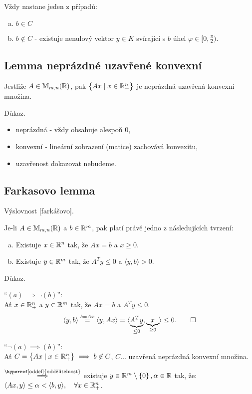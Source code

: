 Vždy nastane jeden z případů:
\begin{enumerate}[(a)]
    \item $b \in C$
    \item $b \not\in C$ - existuje nenulový vektor $y \in K$ svírající s $b$ úhel $\varphi \in [0, \frac{\pi}{2})$.
\end{enumerate}

\subsection{Lemma neprázdné uzavřené konvexní}
Jestliže $A \in \mathbb{M}_{m,n}(\mathbb{R})$, pak $\left\lbrace Ax \mid x \in \mathbb{R}_+^n \right\rbrace$ je neprázdná uzavřená konvexní množina.

Důkaz.
\begin{itemize}
    \item neprázdná - vždy obsahuje alespoň $0$,
    \item konvexní - lineární zobrazení (matice) zachovává konvexitu,
    \item uzavřenost dokazovat nebudeme.
\end{itemize}

\subsection{Farkasovo lemma}\label{farkas}
Výslovnost [farkášovo].

Je-li $A \in \mathbb{M}_{m,n}(\mathbb{R})$ a $b \in \mathbb{R}^m$, pak platí právě jedno z následujících tvrzení:
\begin{enumerate}[(a)]
    \item Existuje $x \in \mathbb{R}^n$ tak, že $Ax = b$ a $x \geq 0$.
    \item Existuje $y \in \mathbb{R}^m$ tak, že $A^Ty \leq 0$ a $\langle y, b\rangle > 0$.
\end{enumerate}

Důkaz.

\enquote{$(a) \implies \lnot (b)$}:\\
Ať $x \in \mathbb{R}^n_+$ a $y \in \mathbb{R}^m$ tak, že $Ax = b$ a $A^T y \leq 0$.
\[
    \langle y, b\rangle \stackrel{b= Ax}{=} \langle y, Ax\rangle = \langle \underbrace{A^Ty}_{\leq 0}, \underbrace{x}_{\geq 0}\rangle \leq 0. \qed 
\]

\enquote{$\lnot (a) \implies (b)$}:\\
Ať $C = \left\lbrace Ax \mid x \in \mathbb{R}^n_+ \right\rbrace \implies b \not\in C$, $C \dots$ uzavřená neprázdná konvexní množina.

$\stackrel{\text{\hyperref[oddel]{oddělitelnost}}}{\implies}$ existuje $y \in \mathbb{R}^m \setminus \left\lbrace 0 \right\rbrace, \alpha \in \mathbb{R}$ tak, 
že: $\langle Ax, y\rangle \leq \alpha < \langle b, y\rangle, \quad \forall x \in \mathbb{R}^n_+$.

